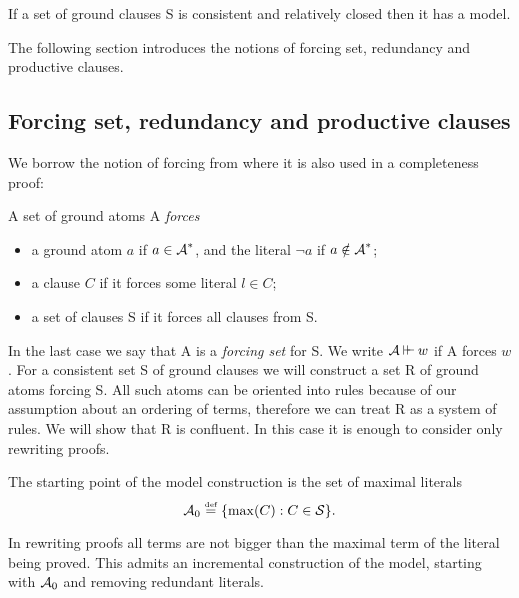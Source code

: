 \begin{THEOREM} \label{th:ground-completeness}
If a set of ground clauses \C S is consistent and relatively closed then it
has a model.
\end{THEOREM}

\noindent The following section introduces the notions of forcing set,
redundancy and productive clauses.

\subsection{Forcing set, redundancy and productive clauses} \label{se:forcing-set}

We borrow the notion of forcing from \cite{PP} where it is also used in a
completeness proof:
\begin{DEFINITION} \label{def:forcing}
A set of ground atoms \C A {\em forces}
\begin{itemize}\MyLPar
\item  a ground atom  $a$ if \(a\in\mbox{$\cal A$}^\ast\), and the literal \(\neg a\) if 
\(a\notin \mbox{$\cal A$}^\ast\);
\item  a clause $C$ if it forces some literal \(l\in C\);
\item  a set of clauses \C S if it forces all clauses from \C S.
\end{itemize}
\end{DEFINITION}

In the last case we say that \C A is a {\em forcing set} for \C S.
We write $\mathrel{\mbox{$\cal A$} \mathbin{\vdash\!\!\vdash} w}$ if \C A forces $w$.
For a consistent set \C S of ground clauses we will construct a set \C R of
ground atoms forcing \C S.
All such atoms can be oriented into rules because of our assumption about an
ordering of terms, therefore we can treat \C R  as a
system of rules. We will show that \C R is confluent.
In this case it is enough to consider only rewriting proofs.

The starting point of the model construction is
the set of maximal literals
\begin{equation} \label{eq:max-atoms-set}
\mbox{$\cal A$}_0 \mathrel{\stackrel{\mbox{\tiny def}}{=}} \{\max(C) : C\in \mbox{$\cal S$}\}.
\end{equation}

In rewriting proofs all terms are not bigger than the maximal term of the 
literal being proved.  This admits an incremental construction of the model, 
starting with $\mbox{$\cal A$}_0$ and removing redundant literals. %


